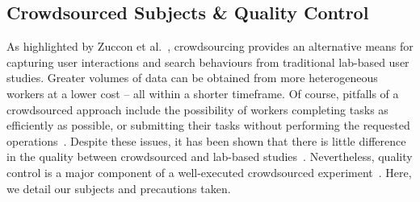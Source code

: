 %
%
%

\subsection{Crowdsourced Subjects \& Quality Control}\label{sec:method:details}
As highlighted by Zuccon et al.~\cite{zuccon2013crowdsourcing}, crowdsourcing provides an alternative means for capturing user interactions and search behaviours from traditional lab-based user studies. Greater volumes of data can be obtained from more heterogeneous workers at a lower cost -- all within a shorter timeframe. Of course, pitfalls of a crowdsourced approach include the possibility of workers completing tasks as efficiently as possible, or submitting their tasks without performing the requested operations~\cite{feild2010turkers}. Despite these issues, it has been shown that there is little difference in the quality between crowdsourced and lab-based studies~\cite{zuccon2013crowdsourcing}. Nevertheless, quality control is a major component of a well-executed crowdsourced experiment~\cite{bota2016playing_your_cards}. Here, we detail our subjects and precautions taken.

